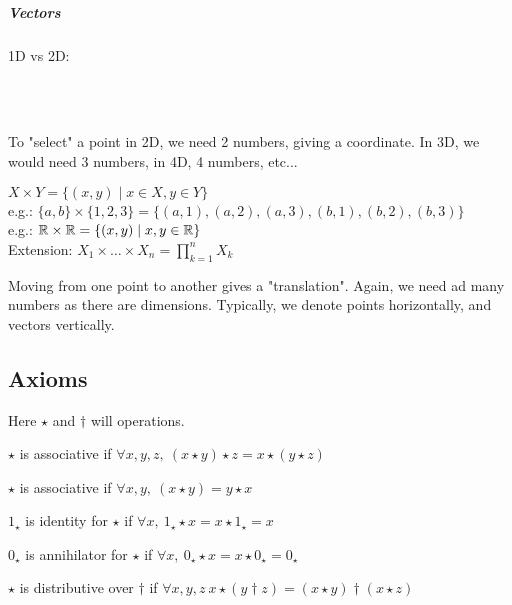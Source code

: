 \subparagraph{Vectors}
1D vs 2D:\vspace{0.2cm}\\
\\
\\
To "select" a point in 2D, we need 2 numbers, giving a coordinate.
In 3D, we would need 3 numbers, in 4D, 4 numbers, etc...
\begin{definition}
    $X \times Y = \{ (x,y) \mid x \in X, y \in Y \}$\\
    e.g.: $\{a,b\} \times \{1,2,3\} = \{ (a,1),(a,2),(a,3), (b,1),(b,2),(b,3) \}$\\
    e.g.: $\mathbb{R} \times \mathbb{R} = \{ (x,y) \mid x,y \in \mathbb{R} \}$\\
    Extension: $X_1 \times \dots \times X_n = \prod_{k=1}^n X_k$
\end{definition}
Moving from one point to another gives a "translation".
Again, we need ad many numbers as there are dimensions.
Typically, we denote points horizontally, and vectors vertically.

\subsection{Axioms}
Here $ \star $ and $ \dagger $ will operations.
\begin{definition}[Associativity]
    $\star$ is associative if $\forall x,y,z, \ (x \star y) \star z = x \star (y \star z)$
\end{definition}
\begin{definition}[Commutativity]
    $\star$ is associative if $\forall x,y, \ (x \star y) = y \star x$
\end{definition}
\begin{definition}[Identity]
    $1_{\star}$ is identity for $\star$ if $\forall x, \ 1_{\star} \star x = x \star 1_{\star} = x$
\end{definition}
\begin{definition}[Annihilator]
    $0_{\star}$ is annihilator for $\star$ if $\forall x, \ 0_{\star} \star x = x \star 0_{\star} = 0_{\star}$
\end{definition}
\begin{definition}[Distributivity]
    $\star$ is distributive over $\dagger$ if $\forall x,y,z \ x \star (y \dagger z) = (x \star y) \dagger (x \star z)$
\end{definition}


